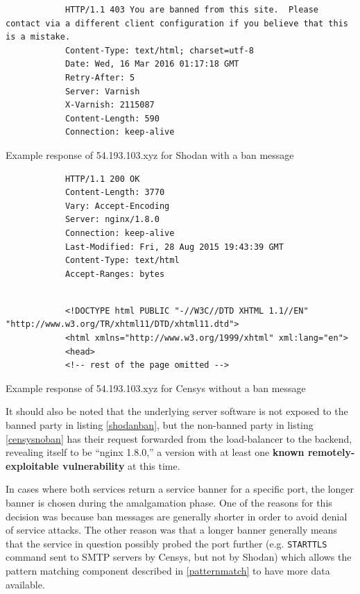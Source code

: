 \documentclass[a4paper,12pt]{article}
\begin{document}
	\begin{listing}[H]
		\begin{verbatim}
			HTTP/1.1 403 You are banned from this site.  Please contact via a different client configuration if you believe that this is a mistake.
			Content-Type: text/html; charset=utf-8
			Date: Wed, 16 Mar 2016 01:17:18 GMT
			Retry-After: 5
			Server: Varnish
			X-Varnish: 2115087
			Content-Length: 590
			Connection: keep-alive
		\end{verbatim}
		\caption{Example response of 54.193.103.xyz for Shodan with a ban message}
		\label{shodanban}
	\end{listing}
		
	\begin{listing}[H]
		\begin{verbatim}
			HTTP/1.1 200 OK
			Content-Length: 3770
			Vary: Accept-Encoding
			Server: nginx/1.8.0
			Connection: keep-alive
			Last-Modified: Fri, 28 Aug 2015 19:43:39 GMT
			Content-Type: text/html
			Accept-Ranges: bytes
		\end{verbatim}
		\vspace{-5pt}
		\begin{verbatim}
			 
			<!DOCTYPE html PUBLIC "-//W3C//DTD XHTML 1.1//EN" "http://www.w3.org/TR/xhtml11/DTD/xhtml11.dtd">
			<html xmlns="http://www.w3.org/1999/xhtml" xml:lang="en">
			<head>
			<!-- rest of the page omitted -->
		\end{verbatim}
		\caption{Example response of 54.193.103.xyz for Censys without a ban message}
		\label{censysnoban}
	\end{listing}

	It should also be noted that the underlying server software is not exposed to the banned party in listing \ref{shodanban}, but the non-banned party in listing \ref{censysnoban} has their request forwarded from the load-balancer to the backend, revealing itself to be ``nginx 1.8.0,'' a version with at least one \textbf{known remotely-exploitable vulnerability}\cite{nginxcve} at this time.

	In cases where both services return a service banner for a specific port, the longer banner is chosen during the amalgamation phase. One of the reasons for this decision was because ban messages are generally shorter\cite{qualys11} in order to avoid denial of service attacks. The other reason was that a longer banner generally means that the service in question possibly probed the port further (e.g. \texttt{STARTTLS} command sent to SMTP servers by Censys, but not by Shodan) which allows the pattern matching component described in \ref{patternmatch} to have more data available.
\end{document}
